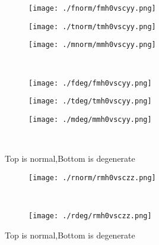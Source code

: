 \documentclass[aps,floats,floatfix,nofootinbib]{revtex4-1}
\begin{document}
\begin{center}
\begin{figure}
\begin{subfigure}{0.3\textwidth}
\texttt{[image: ./fnorm/fmh0vscyy.png]}
\label{}
\end{subfigure}
\begin{subfigure}{0.3\textwidth}
\texttt{[image: ./tnorm/tmh0vscyy.png]}
\label{}
\end{subfigure}
\begin{subfigure}{0.3\textwidth}
\texttt{[image: ./mnorm/mmh0vscyy.png]}
\label{}
\end{subfigure}\\
\begin{subfigure}{0.3\textwidth}
\texttt{[image: ./fdeg/fmh0vscyy.png]}
\label{}
\end{subfigure}
\begin{subfigure}{0.3\textwidth}
\texttt{[image: ./tdeg/tmh0vscyy.png]}
\label{}
\end{subfigure}
\begin{subfigure}{0.3\textwidth}
\texttt{[image: ./mdeg/mmh0vscyy.png]}
\label{}
\end{subfigure}\\
\caption{Top is normal,Bottom is degenerate}
\end{figure}
\end{center}

\begin{center}
\begin{figure}
\begin{subfigure}{0.95\textwidth}
\texttt{[image: ./rnorm/rmh0vsczz.png]}
\label{}
\end{subfigure}\\
\begin{subfigure}{0.95\textwidth}
\texttt{[image: ./rdeg/rmh0vsczz.png]}
\label{}
\end{subfigure}
\caption{Top is normal,Bottom is degenerate}
\end{figure}
\end{center}
\end{document}
